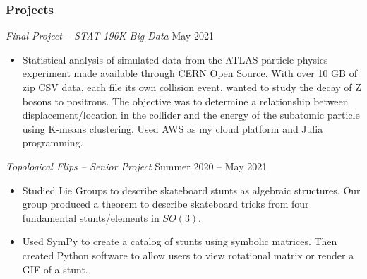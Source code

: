 \documentclass[letterpaper, 10 pt]{article}
\begin{document}
\subsubsection*{Projects}
\centerline{\textit{Final Project – STAT 196K Big Data} \hfill May 2021}
\begin{itemize}
\setlength\itemsep{0.10 em}
\item Statistical analysis of simulated data from the ATLAS particle physics experiment made available through CERN Open Source. With over 10 GB of zip CSV data, each file its own collision event, wanted to study the decay of Z bosons to positrons. The objective was to determine a relationship between displacement/location in the collider and the energy of the subatomic particle using K-means clustering. Used AWS as my cloud platform and Julia programming.
\end{itemize}
\centerline{\textit{Topological Flips – Senior Project} \hfill Summer 2020 – May 2021}
\begin{itemize}
\setlength\itemsep{0.10 em}
\item Studied Lie Groups to describe skateboard stunts as algebraic structures. Our group produced a theorem to describe skateboard tricks from four fundamental stunts/elements in $SO(3)$.
\item Used SymPy to create a catalog of stunts using symbolic matrices. Then created Python software to allow users to view rotational matrix or render a GIF of a stunt.
\end{itemize}
\end{document}
